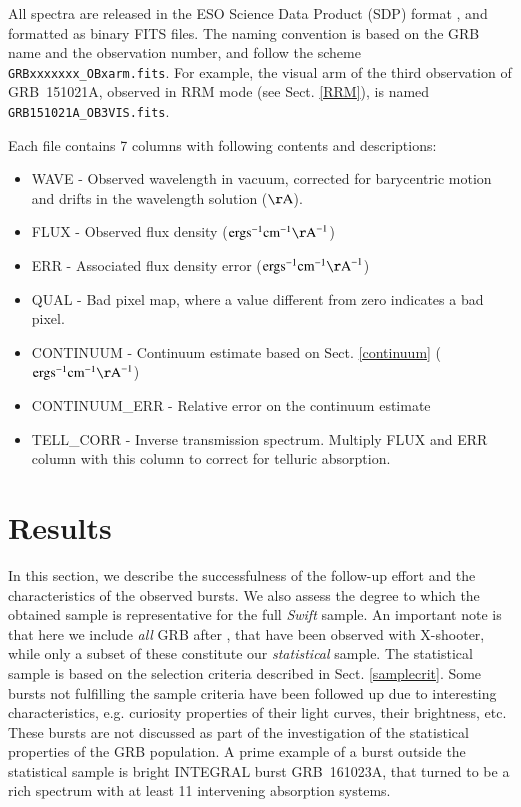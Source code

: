 \documentclass{aa}    %
\begin{document}
All spectra are released in the ESO Science Data Product (SDP) format
\citep{Micol2016}, and formatted as binary FITS files. The naming convention is
based on the GRB name and the observation number, and follow the scheme
\texttt{GRBxxxxxxx\_OBxarm.fits}. For example, the visual arm of the third
observation of GRB~151021A, observed in RRM mode (see Sect. \ref{RRM}), is named
\texttt{GRB151021A\_OB3VIS.fits}.

Each file contains 7 columns with following contents and descriptions:
\begin{itemize}
	\item WAVE - Observed wavelength in vacuum, corrected for barycentric motion and drifts in the wavelength solution ($\mathrm{\AA}$).
	\item FLUX - Observed flux density ($\mathrm{erg} \mathrm{s}^{-1} \mathrm{cm}^{-1} \mathrm{\AA}^{-1}$)
	\item ERR - Associated flux density error ($\mathrm{erg} \mathrm{s}^{-1} \mathrm{cm}^{-1} \mathrm{\AA}^{-1}$)
	\item QUAL - Bad pixel map, where a value different from zero indicates a bad pixel.
	\item CONTINUUM - Continuum estimate based on Sect. \ref{continuum} ($\mathrm{erg} \mathrm{s}^{-1} \mathrm{cm}^{-1} \mathrm{\AA}^{-1}$)
	\item CONTINUUM\_ERR - Relative error on the continuum estimate 
	\item TELL\_CORR - Inverse transmission spectrum. Multiply FLUX and ERR column with this column to correct for telluric absorption. 
\end{itemize}




\section{Results} \label{results}

In this section, we describe the successfulness of the follow-up effort and the
characteristics of the observed bursts. We also assess the degree to which the
obtained sample is representative for the full \textit{Swift} sample. An
important note is that here we include \textit{all} GRB after \startdate, that
have been observed with X-shooter, while only a subset of these constitute our
\textit{statistical} sample. The statistical sample is based on the selection
criteria described in Sect. \ref{samplecrit}. Some bursts not fulfilling the
sample criteria have been followed up due to interesting characteristics, e.g.
curiosity properties of their light curves, their brightness, etc. These bursts
are not discussed as part of the investigation of the statistical properties of
the GRB population. A prime example of a burst outside the statistical sample is
bright INTEGRAL burst GRB~161023A, that turned to be a rich spectrum with at
least 11 intervening absorption systems.
\end{document}
